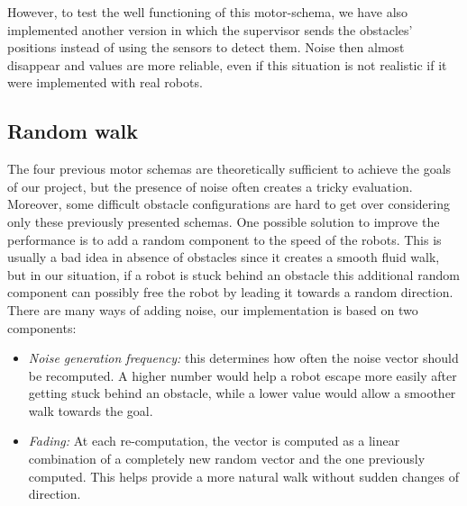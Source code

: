 \documentclass[journal]{IEEEtran}
\begin{document}
However, to test the well functioning of this motor-schema, we have also implemented another version in which the supervisor sends the obstacles' positions instead of using the sensors to detect them. Noise then almost disappear and values are more reliable, even if this situation is not realistic if it were implemented with real robots. 

\subsection{Random walk}
The four previous motor schemas are theoretically sufficient to achieve the goals of our project, but the presence of noise often creates a tricky evaluation. Moreover, some difficult obstacle configurations are hard to get over considering only these previously presented schemas. One possible solution to improve the performance is to add a random component to the speed of the robots. This is usually a bad idea in absence of obstacles since it creates a smooth fluid walk, but in our situation, if a robot is stuck behind an obstacle this additional random component can possibly free the robot by leading it towards a random direction.
There are many ways of adding noise, our implementation is based on two
components:
\begin{itemize}
\item \textit{Noise generation frequency:} this determines how often the noise vector should be recomputed. A higher number would help a robot escape more easily after getting stuck behind an obstacle, while a lower value would allow a smoother walk towards the goal.
\item \textit{Fading:} At each re-computation, the vector is computed as a linear combination of a completely new random vector and the one previously computed. This helps provide a more natural walk without sudden changes of direction.
\end{itemize}





\end{document}
